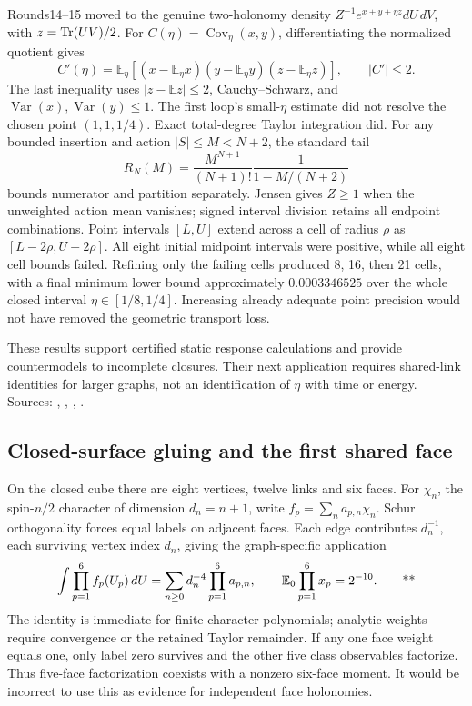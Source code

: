Rounds14--15 moved to the genuine two-holonomy density
\(Z^{-1}e^{x+y+\eta z}dU\,dV\), with
\(z=\operatorname{Tr}(UV)/2\). For \(C(\eta)=\operatorname{Cov}_\eta(x,y)\),
differentiating the normalized quotient gives
\[
 C'(\eta)=\mathbb E_\eta[
 (x-\mathbb E_\eta x)(y-\mathbb E_\eta y)(z-\mathbb E_\eta z)],
 \qquad |C'|\le2.
\]
The last inequality uses \(|z-\mathbb Ez|\le2\), Cauchy--Schwarz, and
\(\operatorname{Var}(x),\operatorname{Var}(y)\le1\).
The first loop's small-\(\eta\) estimate did not resolve the chosen point
\((1,1,1/4)\). Exact total-degree Taylor integration did.
For any bounded insertion and action \(|S|\le M<N+2\), the standard tail
\[
 R_N(M)=\frac{M^{N+1}}{(N+1)!}\frac1{1-M/(N+2)}
\]
bounds numerator and partition separately. Jensen gives \(Z\ge1\) when
the unweighted action mean vanishes; signed interval division retains all
endpoint combinations. Point intervals \([L,U]\) extend across a cell of
radius \(\rho\) as \([L-2\rho,U+2\rho]\). All eight initial midpoint
intervals were positive, while all eight cell bounds failed. Refining only
the failing cells produced 8, 16, then 21 cells, with a final minimum lower
bound approximately \(0.0003346525\) over the whole closed interval
\(\eta\in[1/8,1/4]\). Increasing already adequate point precision would not
have removed the geometric transport loss.

These results support certified static response calculations and provide
countermodels to incomplete closures. Their next application requires
shared-link identities for larger graphs, not an identification of \(\eta\)
with time or energy. Sources:
,
,
,
.

\subsection{Closed-surface gluing and the first shared face \workstar}
\label{sec:middle-gluing}

On the closed cube there are eight vertices, twelve links and six faces.
For \(\chi_n\), the spin-\(n/2\) character of dimension \(d_n=n+1\), write
\(f_p=\sum_n a_{p,n}\chi_n\). Schur orthogonality forces equal labels on
adjacent faces. Each edge contributes \(d_n^{-1}\), each surviving vertex
index \(d_n\), giving the graph-specific application
\begin{equation}
 \int\prod_{p=1}^{6}f_p(U_p)\,dU
       =\sum_{n\ge0}d_n^{-4}\prod_{p=1}^{6}a_{p,n},
 \qquad
 \mathbb E_0\prod_{p=1}^{6}x_p=2^{-10}.
 \qquad\text{**}
 \label{eq:middle-cube}
\end{equation}
The identity is immediate for finite character polynomials; analytic
weights require convergence or the retained Taylor remainder. If any one
face weight equals one, only label zero survives and the other five class
observables factorize. Thus five-face factorization coexists with a
nonzero six-face moment. It would be incorrect to use this as evidence for
independent face holonomies.

